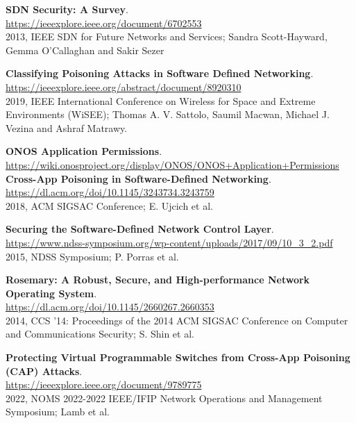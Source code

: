 \documentclass[a4paper,10pt]{memoir}
\begin{document}
{\begin{thebibliography}{9}
  \textbf{SDN Security: A Survey}.\\
  \href{https://ieeexplore.ieee.org/document/6702553}{https://ieeexplore.ieee.org/document/6702553}\\
  2013, IEEE SDN for Future Networks and Services; Sandra Scott-Hayward, Gemma O’Callaghan and Sakir Sezer

  \textbf{Classifying Poisoning Attacks in Software Defined Networking}.\\
  \href{https://ieeexplore.ieee.org/abstract/document/8920310}{https://ieeexplore.ieee.org/abstract/document/8920310}\\
  2019, IEEE International Conference on Wireless for Space and Extreme Environments (WiSEE); Thomas A. V. Sattolo, Saumil Macwan, Michael J. Vezina and Ashraf Matrawy.
 
  \textbf{ONOS Application Permissions}.\\
  \href{https://wiki.onosproject.org/display/ONOS/ONOS+Application+Permissions}{https://wiki.onosproject.org/display/ONOS/ONOS+Application+Permissions}\\

  \textbf{Cross-App Poisoning in Software-Defined Networking}.\\
  \href{https://dl.acm.org/doi/10.1145/3243734.3243759}{https://dl.acm.org/doi/10.1145/3243734.3243759}\\
  2018, ACM SIGSAC Conference; E. Ujcich et al.

  \textbf{Securing the Software-Defined Network Control Layer}.\\
  \href{https://www.ndss-symposium.org/wp-content/uploads/2017/09/10_3_2.pdf}{https://www.ndss-symposium.org/wp-content/uploads/2017/09/10\_3\_2.pdf}\\
  2015, NDSS Symposium; P. Porras et al.

  \textbf{Rosemary: A Robust, Secure, and High-performance Network Operating System}.\\
  \href{https://dl.acm.org/doi/10.1145/2660267.2660353}{https://dl.acm.org/doi/10.1145/2660267.2660353}\\
  2014, CCS '14: Proceedings of the 2014 ACM SIGSAC Conference on Computer and Communications Security; S. Shin et al.

  \textbf{Protecting Virtual Programmable Switches from Cross-App Poisoning (CAP) Attacks}.\\
  \href{https://ieeexplore.ieee.org/document/9789775}{https://ieeexplore.ieee.org/document/9789775}\\
  2022, NOMS 2022-2022 IEEE/IFIP Network Operations and Management Symposium; Lamb et al.


\end{thebibliography}}
\end{document}

